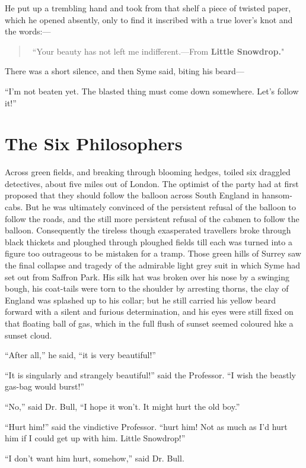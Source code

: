 \documentclass{book}
\begin{document}
He put up a trembling hand and took from that shelf a piece of twisted paper, which he opened absently, only to find it inscribed with a true lover’s knot and the words:—

\begin{quotation}\
	“Your beauty has not left me indifferent.—From \textbf{Little Snowdrop.}"
\end{quotation}

There was a short silence, and then Syme said, biting his beard—

“I’m not beaten yet. The blasted thing must come down somewhere. Let’s follow it!”

\chapter{The Six Philosophers}
\label{chapter-13}
Across green fields, and breaking through blooming hedges, toiled six draggled detectives, about five miles out of London. The optimist of the party had at first proposed that they should follow the balloon across South England in hansom-cabs. But he was ultimately convinced of the persistent refusal of the balloon to follow the roads, and the still more persistent refusal of the cabmen to follow the balloon. Consequently the tireless though exasperated travellers broke through black thickets and ploughed through ploughed fields till each was turned into a figure too outrageous to be mistaken for a tramp. Those green hills of Surrey saw the final collapse and tragedy of the admirable light grey suit in which Syme had set out from Saffron Park. His silk hat was broken over his nose by a swinging bough, his coat-tails were torn to the shoulder by arresting thorns, the clay of England was splashed up to his collar; but he still carried his yellow beard forward with a silent and furious determination, and his eyes were still fixed on that floating ball of gas, which in the full flush of sunset seemed coloured hke a sunset cloud.

“After all,” he said, “it is very beautiful!”

“It is singularly and strangely beautiful!” said the Professor. “I wish the beastly gas-bag would burst!”

“No,” said Dr. Bull, “I hope it won’t. It might hurt the old boy.”

“Hurt him!” said the vindictive Professor. “hurt him! Not as much as I’d hurt him if I could get up with him. Little Snowdrop!”

“I don’t want him hurt, somehow,” said Dr. Bull.
\end{document}
